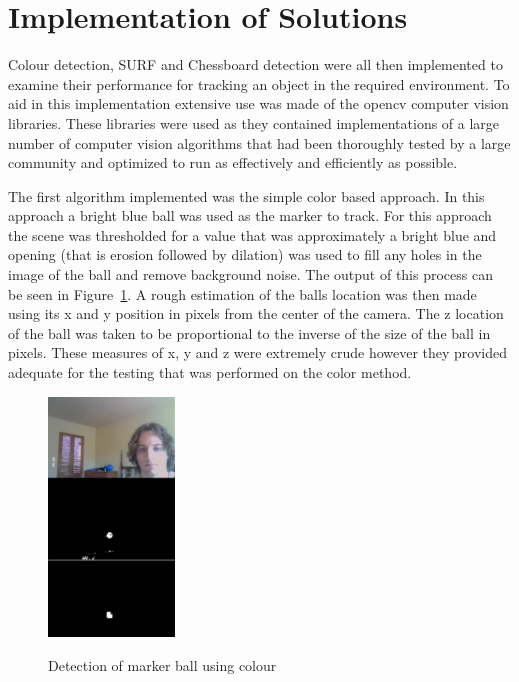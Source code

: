 \section{Implementation of Solutions}

Colour detection, SURF and Chessboard detection were all then implemented to examine their performance for tracking an object in the required environment. To aid in this implementation extensive use was made of the opencv computer vision libraries. These libraries were used as they contained implementations of a large number of computer vision algorithms that had been thoroughly tested by a large community and optimized to run as effectively and efficiently as possible.

The first algorithm implemented was the simple color based approach. In this approach a bright blue ball was used as the marker to track. For this approach the scene was thresholded for a value that was approximately  a bright blue and opening (that is erosion followed by dilation) was used to fill any holes in the image of the ball and remove background noise. The output of this process can be seen in Figure~\ref{ball}. A rough estimation of the balls location was then made using its x and y position in pixels from the center of the camera. The z location of the ball was taken to be proportional to the inverse of the size of the ball in pixels. These measures of x, y and z were extremely crude however they provided adequate for the testing that was performed on the color method.

\begin{figure}[h]
	\begin{center}
		\includegraphics[width=0.3\textwidth]{2}
		\label{ball}
	\end{center}
	\caption{Detection of marker ball using colour}
\end{figure}

